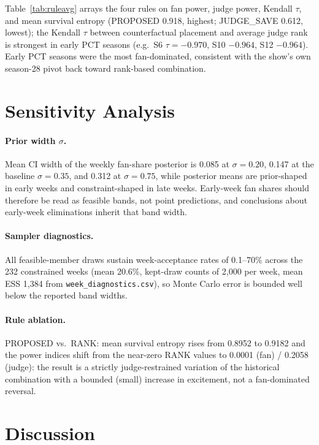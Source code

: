 \documentclass[11pt]{article}
\begin{document}
Table~\ref{tab:ruleavg} arrays the four rules on fan power, judge power,
Kendall $\tau$, and mean survival entropy (PROPOSED 0.918, highest;
JUDGE\_SAVE 0.612, lowest); the Kendall $\tau$ between counterfactual
placement and average judge rank is strongest in early PCT seasons
(e.g.\ S6 $\tau = -0.970$, S10 $-0.964$, S12 $-0.964$). Early PCT
seasons were the most fan-dominated, consistent with the show's own
season-28 pivot back toward rank-based combination.

\section{Sensitivity Analysis}

\paragraph{Prior width $\sigma$.} Mean CI width of the weekly fan-share
posterior is 0.085 at $\sigma = 0.20$, 0.147 at the baseline $\sigma =
0.35$, and 0.312 at $\sigma = 0.75$, while posterior means are
prior-shaped in early weeks and constraint-shaped in late weeks.
Early-week fan shares should therefore be read as feasible bands, not
point predictions, and conclusions about early-week eliminations inherit
that band width.

\paragraph{Sampler diagnostics.} All feasible-member draws sustain
week-acceptance rates of 0.1--70\% across the 232 constrained weeks
(mean 20.6\%, kept-draw counts of 2,000 per week, mean ESS 1,384 from
\texttt{week\_diagnostics.csv}), so Monte Carlo error is bounded well
below the reported band widths.

\paragraph{Rule ablation.} PROPOSED vs.\ RANK: mean survival entropy
rises from 0.8952 to 0.9182 and the power indices shift from the
near-zero RANK values to 0.0001 (fan) / 0.2058 (judge): the result is a
strictly judge-restrained variation of the historical combination with a
bounded (small) increase in excitement, not a fan-dominated reversal.

\section{Discussion}
\end{document}
